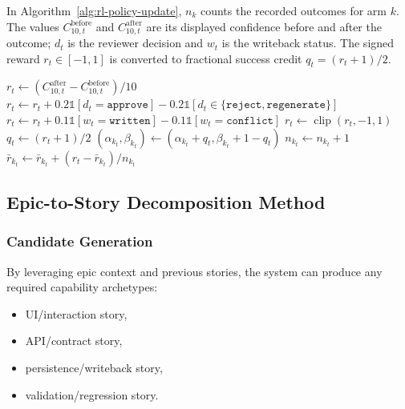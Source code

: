 \documentclass[manuscript,review]{acmart}
\begin{document}
In Algorithm~\ref{alg:rl-policy-update}, $n_k$ counts the recorded outcomes for arm $k$. The values $C^{\mathrm{before}}_{10,t}$ and $C^{\mathrm{after}}_{10,t}$ are its displayed confidence before and after the outcome; $d_t$ is the reviewer decision and $w_t$ is the writeback status. The signed reward $r_t\in[-1,1]$ is converted to fractional success credit $q_t=(r_t+1)/2$.

\begin{algorithm}[H]
\DontPrintSemicolon
\footnotesize
\caption{Prompt Policy Update (Bandit + Governance-Aware Reward)}
\label{alg:rl-policy-update}
$r_t \leftarrow (C^{\mathrm{after}}_{10,t}-C^{\mathrm{before}}_{10,t})/10$\;
$r_t \leftarrow r_t+0.2\mathbb{1}[d_t=\texttt{approve}]-0.2\mathbb{1}[d_t\in\{\texttt{reject},\texttt{regenerate}\}]$\;
$r_t \leftarrow r_t+0.1\mathbb{1}[w_t=\texttt{written}]-0.1\mathbb{1}[w_t=\texttt{conflict}]$\;
$r_t \leftarrow \operatorname{clip}(r_t,-1,1)$\;
$q_t \leftarrow (r_t+1)/2$\;
$(\alpha_{k_t},\beta_{k_t}) \leftarrow (\alpha_{k_t}+q_t,\beta_{k_t}+1-q_t)$\;
$n_{k_t} \leftarrow n_{k_t}+1$\;
$\bar r_{k_t} \leftarrow \bar r_{k_t}+(r_t-\bar r_{k_t})/n_{k_t}$\;
\;
\end{algorithm}

\FloatBarrier
\subsection{Epic-to-Story Decomposition Method}


\subsubsection{Candidate Generation}
By leveraging epic context and previous stories, the system can produce any required capability archetypes:
\begin{itemize}
  \item UI/interaction story,
  \item API/contract story,
  \item persistence/writeback story,
  \item validation/regression story.
\end{itemize}
\end{document}
